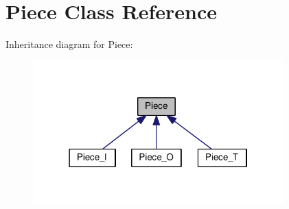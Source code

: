 \hypertarget{class_piece}{}\section{Piece Class Reference}
\label{class_piece}


Inheritance diagram for Piece\+:
\nopagebreak
\begin{figure}[H]
\begin{center}
\leavevmode
\includegraphics[width=274pt]{class_piece__inherit__graph}
\end{center}
\end{figure}
